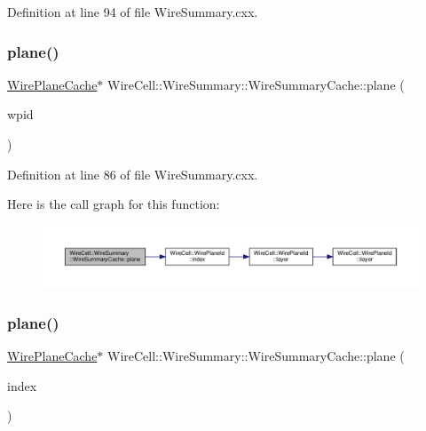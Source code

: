 Definition at line 94 of file Wire\+Summary.\+cxx.

\mbox{\label{struct_wire_summary_1_1_wire_summary_cache_a07cff10416e77d84eceeb80622e67d2e}} 
\subsubsection{\texorpdfstring{plane()}{plane()}\hspace{0.1cm}{\footnotesize\ttfamily [1/2]}}
{\footnotesize\ttfamily \hyperlink{struct_wire_plane_cache}{Wire\+Plane\+Cache}$\ast$ Wire\+Cell\+::\+Wire\+Summary\+::\+Wire\+Summary\+Cache\+::plane (\begin{DoxyParamCaption}\item[{\hyperlink{class_wire_cell_1_1_wire_plane_id}{Wire\+Plane\+Id}}]{wpid }\end{DoxyParamCaption})\hspace{0.3cm}{\ttfamily [inline]}}



Definition at line 86 of file Wire\+Summary.\+cxx.

Here is the call graph for this function\+:
\nopagebreak
\begin{figure}[H]
\begin{center}
\leavevmode
\includegraphics[width=350pt]{struct_wire_summary_1_1_wire_summary_cache_a07cff10416e77d84eceeb80622e67d2e_cgraph}
\end{center}
\end{figure}
\mbox{\label{struct_wire_summary_1_1_wire_summary_cache_a86147b0ab4bc28d672a3b0d7c969445e}} 
\subsubsection{\texorpdfstring{plane()}{plane()}\hspace{0.1cm}{\footnotesize\ttfamily [2/2]}}
{\footnotesize\ttfamily \hyperlink{struct_wire_plane_cache}{Wire\+Plane\+Cache}$\ast$ Wire\+Cell\+::\+Wire\+Summary\+::\+Wire\+Summary\+Cache\+::plane (\begin{DoxyParamCaption}\item[{int}]{index }\end{DoxyParamCaption})\hspace{0.3cm}{\ttfamily [inline]}}



